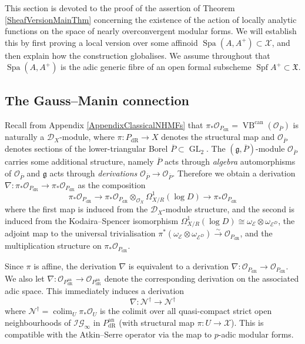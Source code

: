 \documentclass[10pt, oneside]{amsart}
\numberwithin{equation}{subsection}
\theoremstyle{definition}
\theoremstyle{remark}
\newcommand{\opn}[1]{\operatorname{#1}}
\begin{document}
This section is devoted to the proof of the assertion of Theorem \ref{SheafVersionMainThm} concerning the existence of the action of locally analytic functions on the space of nearly overconvergent modular forms. We will establish this by first proving a local version over some affinoid $\opn{Spa}(A, A^+) \subset \mathcal{X}$, and then explain how the construction globalises. We assume throughout that $\opn{Spa}(A, A^+)$ is the adic generic fibre of an open formal subscheme $\opn{Spf}A^+ \subset \mathfrak{X}$.

\subsection{The Gauss--Manin connection} \label{TheGMConnectionSubSec}

Recall from Appendix \ref{AppendixClassicalNHMFs} that $\pi_* \mathcal{O}_{P_{\opn{dR}}} = \opn{VB}^{\opn{can}}(\mathcal{O}_{\overline{P}})$ is naturally a $\mathcal{D}_X$-module, where $\pi \colon P_{\opn{dR}} \to X$ denotes the structural map and $\mathcal{O}_{\overline{P}}$ denotes sections of the lower-triangular Borel $\overline{P} \subset \opn{GL}_2$. The $(\mathfrak{g}, \overline{P})$-module $\mathcal{O}_{\overline{P}}$ carries some additional structure, namely $\overline{P}$ acts through \emph{algebra} automorphisms of $\mathcal{O}_{\overline{P}}$ and $\mathfrak{g}$ acts through \emph{derivations} $\mathcal{O}_{\overline{P}} \to \mathcal{O}_{\overline{P}}$. Therefore we obtain a derivation $\nabla \colon \pi_*\mathcal{O}_{P_{\opn{dR}}} \to \pi_*\mathcal{O}_{P_{\opn{dR}}}$ as the composition 
\begin{equation} \label{DerivationCompositionEqn}
\pi_*\mathcal{O}_{P_{\opn{dR}}} \to \pi_*\mathcal{O}_{P_{\opn{dR}}} \otimes_{\mathcal{O}_X} \Omega^1_{X/R}(\opn{log}D) \to \pi_*\mathcal{O}_{P_{\opn{dR}}}
\end{equation}
where the first map is induced from the $\mathcal{D}_X$-module structure, and the second is induced from the Kodaira--Spencer isomorphism $\Omega^1_{X/R}(\opn{log}D) \cong \omega_{\mathcal{E}} \otimes \omega_{\mathcal{E}^D}$, the adjoint map to the universal trivialisation $\pi^*(\omega_{\mathcal{E}} \otimes \omega_{\mathcal{E}^D}) \xrightarrow{\sim} \mathcal{O}_{P_{\opn{dR}}}$, and the multiplication structure on $\pi_*\mathcal{O}_{P_{\opn{dR}}}$.

Since $\pi$ is affine, the derivation $\nabla$ is equivalent to a derivation $\nabla \colon \mathcal{O}_{P_{\opn{dR}}} \to \mathcal{O}_{P_{\opn{dR}}}$. We also let $\nabla \colon \mathcal{O}_{P_{\opn{dR}}^{\opn{an}}} \to \mathcal{O}_{P_{\opn{dR}}^{\opn{an}}}$ denote the corresponding derivation on the associated adic space. This immediately induces a derivation
\[
\nabla \colon \mathcal{N}^{\dagger} \to \mathcal{N}^{\dagger}
\]
where $\mathcal{N}^{\dagger} = \opn{colim}_U \pi_* \mathcal{O}_U$ is the colimit over all quasi-compact strict open neighbourhoods of $\mathcal{IG}_{\infty}$ in $P_{\opn{dR}}^{\opn{an}}$ (with structural map $\pi \colon U \to \mathcal{X}$). This is compatible with the Atkin--Serre operator via the map to $p$-adic modular forms.
\end{document}
